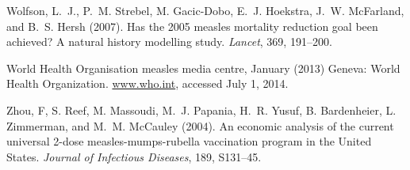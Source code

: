 \documentclass{article}
\begin{document}
\begin{thebibliography}{}
Wolfson, L.~J., P.~M. Strebel, M. Gacic-Dobo, E.~J. Hoekstra, J.~W. McFarland, and B.~S. Hersh (2007).
\newblock Has the 2005 measles mortality reduction goal been achieved? A natural history modelling study.
\newblock \emph{Lancet}, 369, 191--200.

World Health Organisation measles media centre, January (2013)
\newblock Geneva: World Health Organization.
\href{http://www.who.int/mediacentre/news/notes/2013/measles_20130117/en/}{www.who.int}, accessed July 1, 2014.

Zhou, F, S. Reef, M. Massoudi, M.~J. Papania, H.~R. Yusuf, B. Bardenheier, L. Zimmerman, and M.~M. McCauley (2004).
\newblock An economic analysis of the current universal 2-dose measles-mumps-rubella vaccination program in the United States.
\newblock \emph{Journal of Infectious Diseases}, 189, S131--45.

\end{thebibliography}
\end{document}
